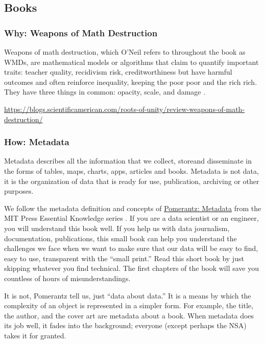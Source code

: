 \documentclass[
  fontsize=13pt,
  english,
  a4paper,
  openany, a4paper, oneside]{book}
\begin{document}
\hypertarget{books}{%
\subsection{Books}\label{books}}

\hypertarget{why-weapons-of-math-destruction}{%
\subsubsection{Why: Weapons of Math Destruction}\label{why-weapons-of-math-destruction}}

Weapons of math destruction, which O'Neil refers to throughout the book as WMDs, are mathematical models or algorithms that claim to quantify important traits: teacher quality, recidivism risk, creditworthiness but have harmful outcomes and often reinforce inequality, keeping the poor poor and the rich rich. They have three things in common: opacity, scale, and damage \citep{weapons_of_math_destruction}.

\url{https://blogs.scientificamerican.com/roots-of-unity/review-weapons-of-math-destruction/}

\hypertarget{how-metadata}{%
\subsubsection{How: Metadata}\label{how-metadata}}

Metadata describes all the information that we collect, storeand disseminate in the forms of tables, maps, charts, apps, articles and books. Metadata is not data, it is the organization of data that is ready for use, publication, archiving or other purposes.

We follow the metadata definition and concepts of \href{https://mitpress.mit.edu/books/metadata}{Pomerantz: Metadata} from the MIT Press Essential Knowledge series \citep{pomerantz_2015}. If you are a data scientist or an engineer, you will understand this book well. If you help us with data journalism, documentation, publications, this small book can help you understand the challenges we face when we want to make sure that our data will be easy to find, easy to use, transparent with the ``small print.'' Read this short book by just skipping whatever you find technical. The first chapters of the book will save you countless of hours of misunderstandings.

It is not, Pomerantz tell us, just ``data about data.'' It is a means by which the complexity of an object is represented in a simpler form. For example, the title, the author, and the cover art are metadata about a book. When metadata does its job well, it fades into the background; everyone (except perhaps the NSA) takes it for granted.
\end{document}
